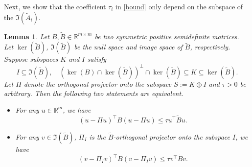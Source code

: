 \documentclass{article}
\newtheorem{lemma}[theorem]{Lemma}
\theoremstyle{definition}
\theoremstyle{remark}
\begin{document}
Next, we show that the coefficient $\tau_i$ in \cref{bound} only depend on the subspace of the $\Im(\tilde A_i)$.

\begin{lemma}\label{conddep}
    Let \( B, \tilde{B} \in \mathbb{R}^{m \times m} \) be two symmetric positive semidefinite matrices.
    Let \( \ker(\tilde{B}) \), \( \Im(\tilde{B}) \) be the null space and image space of \( \tilde{B} \), respectively.
    Suppose subspaces $K$ and $I$ satisfy
\[
I \subseteq \Im(\tilde B), \quad (\ker(B)\cap \ker(\tilde B))^{\perp} \cap \ker(\tilde B) \subseteq K \subseteq \ker(\tilde B).
\]
Let $\Pi$ denote the orthogonal projector onto the subspace $S := K \oplus I$ and $\tau>0$ be arbitrary. Then the following two statements are equivalent.
\begin{itemize}
    \item For any $u \in \mathbb{R}^{m}$, we have
    \[
    (u - \Pi u)^\top B (u - \Pi u) \leq \tau u^\top \tilde B u.
    \]
    \item For any $v \in \Im(\tilde B)$, $\Pi_I$ is the $\tilde{B}$-orthogonal projector onto the subspace $I$, we have
    \[
    (v - \Pi_I v)^\top B (v - \Pi_I v) \leq \tau v^\top \tilde B v.
    \]
\end{itemize}
\end{lemma}
\end{document}
